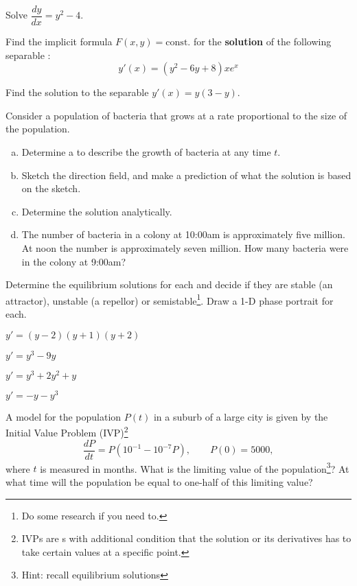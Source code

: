 \begin{question}
    Solve \(\dfrac{dy}{dx} = y^2 - 4\).
\end{question}


\begin{question}
  Find the implicit formula \(F(x,y) = \text{const.}\) for the \textbf{solution} of the following separable \ode{}:
  \[
    y'(x) = (y^{2} -6y + 8) x e^{x}
  \]
\end{question}


\begin{question}
    Find the solution to the separable \ode{} \(y'(x) = y(3-y)\).
\end{question}

\begin{question}
Consider a population of bacteria that grows at a rate proportional to the size of the population.
\begin{enumerate}[(a)]
\item Determine a \ode{} to describe the growth of
  bacteria at any time $t$.
\item Sketch the direction field, and make a prediction of what the solution is based on the sketch.
\item Determine the solution analytically.
\item The number of bacteria in a colony at 10:00am is approximately five million. At
noon the number is approximately seven million. How many bacteria were in the colony at
9:00am?
\end{enumerate}
\end{question}

\begin{question}Determine the equilibrium solutions for each \ode{} and decide if they are
stable (an attractor), unstable (a repellor) or semistable\footnote{Do some research if you need to.}.   Draw a 1-D phase portrait for each.
  \begin{colenumerate}
  \item  $y'=(y-2)(y+1)(y+2)$
  \item $y'=y^3-9y$
  \item $y'=y^3+2y^2+y$
  \item $y'=-y-y^3$
  \end{colenumerate}
\end{question}

\begin{question}
A model for the population $P(t)$ in a suburb of a large city is given by the Initial Value Problem (IVP)\footnote{IVPs are \ode{}s with additional condition that the solution or its derivatives has to take certain values at a specific point.}
\[
\frac{dP}{dt} = P(10^{-1} - 10^{-7}P), \qquad P(0) = 5000,
\]
where $t$ is measured in months. What is the limiting value of the population\footnote{Hint: recall equilibrium solutions}? At what time will the population be equal to one-half of this limiting value?
\end{question}


